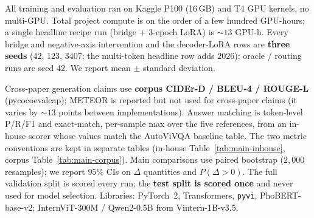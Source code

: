 All training and evaluation ran on Kaggle P100 (16\,GB) and T4 GPU kernels, no
multi-GPU. Total project compute is on the order of a few hundred GPU-hours; a
single headline recipe run (bridge $+$ 3-epoch LoRA) is ${\sim}13$ GPU-h. Every
bridge and negative-axis intervention and the decoder-LoRA rows are
\textbf{three seeds} ($42$, $123$, $3407$; the multi-token headline row adds
$2026$); oracle / routing runs are seed $42$. We report mean $\pm$ standard
deviation.

Cross-paper generation claims use \textbf{corpus CIDEr-D / BLEU-4 / ROUGE-L}
(pycocoevalcap); METEOR is reported but not used for cross-paper claims (it
varies by ${\sim}13$ points between implementations). Answer matching is
token-level P/R/F1 and exact-match, per-sample max over the five references, from
an in-house scorer whose values match the AutoViVQA baseline table. The two
metric conventions are kept in separate tables (in-house
Table~\ref{tab:main-inhouse}, corpus Table~\ref{tab:main-corpus}). Main
comparisons use paired bootstrap ($2{,}000$ resamples); we report $95\%$ CIs on
$\Delta$ quantities and $P(\Delta > 0)$. The full validation split is scored
every run; the \textbf{test split is scored once} and never used for model
selection. Libraries: PyTorch~2, Transformers, \texttt{pyvi}, PhoBERT-base-v2;
InternViT-300M / Qwen2-0.5B from Vintern-1B-v3.5.
